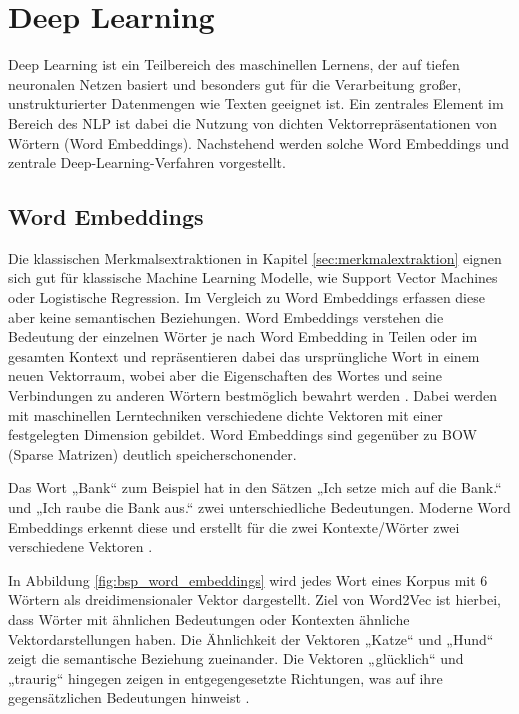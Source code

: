 \section{Deep Learning}
\label{sec:deep_learning}

Deep Learning ist ein Teilbereich des maschinellen Lernens, der auf tiefen neuronalen Netzen basiert und besonders gut für die Verarbeitung großer, 
unstrukturierter Datenmengen wie Texten geeignet ist.
Ein zentrales Element im Bereich des NLP ist dabei die Nutzung von dichten Vektorrepräsentationen von Wörtern (Word Embeddings).
Nachstehend werden solche Word Embeddings und zentrale Deep-Learning-Verfahren vorgestellt.


\subsection{Word Embeddings}
\label{sec:word_embeddings}

Die klassischen Merkmalsextraktionen in Kapitel \ref{sec:merkmalextraktion} eignen sich gut für klassische Machine Learning Modelle, wie
Support Vector Machines oder Logistische Regression.
Im Vergleich zu Word Embeddings erfassen diese aber keine semantischen Beziehungen.
Word Embeddings verstehen die Bedeutung der einzelnen Wörter je nach Word Embedding in Teilen oder im gesamten Kontext \cite{Deshai:2023aa}
und repräsentieren dabei das ursprüngliche Wort in einem neuen Vektorraum, wobei aber die Eigenschaften des Wortes und seine Verbindungen 
zu anderen Wörtern bestmöglich bewahrt werden \cite{Schaer2023}.
Dabei werden mit maschinellen Lerntechniken verschiedene dichte Vektoren mit einer festgelegten Dimension gebildet.
Word Embeddings sind gegenüber zu BOW (Sparse Matrizen) deutlich speicherschonender.

Das Wort „Bank“ zum Beispiel hat in den Sätzen „Ich setze mich auf die Bank.“ und „Ich raube die Bank aus.“ zwei unterschiedliche Bedeutungen. 
Moderne Word Embeddings erkennt diese und erstellt für die zwei Kontexte/Wörter zwei verschiedene Vektoren \cite{skopos2023wordembeddings}.

In Abbildung \ref{fig:bsp_word_embeddings} wird jedes Wort eines Korpus mit 6 Wörtern als dreidimensionaler Vektor dargestellt.
Ziel von Word2Vec ist hierbei, dass Wörter mit ähnlichen Bedeutungen oder Kontexten ähnliche Vektordarstellungen haben. 
Die Ähnlichkeit der Vektoren „Katze“ und „Hund“ zeigt die semantische Beziehung zueinander. Die Vektoren „glücklich“ und „traurig“ 
hingegen zeigen in entgegengesetzte Richtungen, was auf ihre gegensätzlichen Bedeutungen hinweist \cite{ibm2024wordembeddings}.

